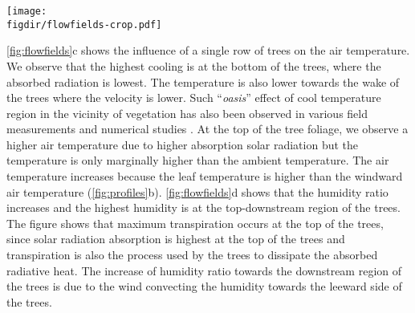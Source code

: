 
	\begin{sidewaysfigure}[p]
	\centering
	\texttt{[image: \\figdir/flowfields-crop.pdf]}
	\caption{Flow field past a single row of trees for the reference case with domain described in \cref{fig:domain}, with $r_s=r_{\textit{s,min}}$ and environmental and tree properties tabulated in \cref{tab:environmentalcond,tab:plantcond}, respectively.  Normalized velocity $\tavg{\mvec{u}}/U_{\textit{ref}}$,  turbulence intensity $\textit{TI}=(2/3\,k)/\tavg{\mvec{u}}$  air temperature $T$ ($^{\circ}$C) and  humidity ratio $w$ (g\,kg$^{-1}$).}
	\label{fig:flowfields}
	\end{sidewaysfigure}

\cref{fig:flowfields}c shows the influence of a single row of trees on the air temperature. We observe that the highest cooling is at the bottom of the trees, where the absorbed radiation is lowest. The temperature is also lower towards the wake of the trees where the velocity is lower. Such ``\textit{oasis}'' effect of cool temperature region in the vicinity of vegetation has also been observed in various field measurements \citep{Kurn1994, Taha1997, Wong2003} and numerical studies \citep{Dimoudi2003,Gromke2011}. At the top of the tree foliage, we observe a higher air temperature due to higher absorption solar radiation but the temperature is only marginally higher than the ambient temperature. The air temperature increases because the leaf temperature is higher than the windward air temperature (\cref{fig:profiles}b). \cref{fig:flowfields}d shows that the humidity ratio increases and the highest humidity is at the top-downstream region of the trees. The figure shows that maximum transpiration occurs at the top of the trees, since solar radiation absorption is highest at the top of the trees and transpiration is also the process used by the trees to dissipate the absorbed radiative heat. The increase of humidity ratio towards the downstream region of the trees is due to the wind convecting the humidity towards the leeward side of the trees.


